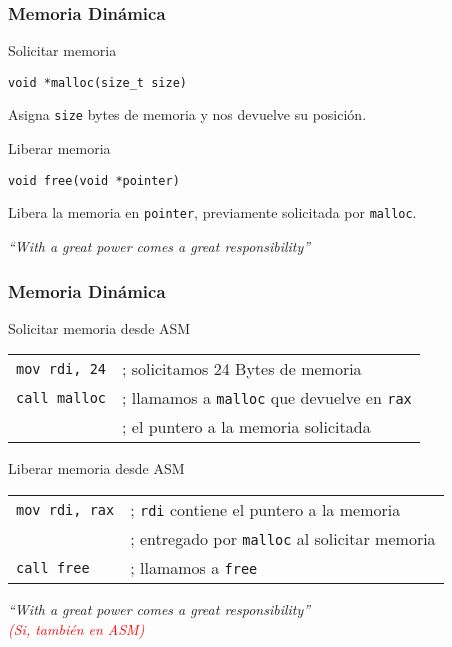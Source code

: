 \documentclass[aspectratio=169]{beamer}
\begin{document}
\begin{frame}[t]
    \frametitle{Memoria Dinámica}
    \begin{block}{Solicitar memoria}
    \begin{center}
    \textcolor{verdeuca}{\texttt{void *malloc(size\_t size)}}\\
    \end{center}
    Asigna \texttt{size} bytes de memoria y nos devuelve su posición.
    \end{block}
    \vspace{0.5cm}
    \pause
    \begin{block}{Liberar memoria}
    \begin{center}
    \textcolor{verdeuca}{\texttt{void free(void *pointer)}}\\
    \end{center}
    Libera la memoria en \texttt{pointer}, previamente solicitada por \texttt{malloc}.
    \end{block}
    \pause
    \vspace{0.3cm}
    \begin{center}
    \textit{``With a great power comes a great responsibility''} 
    \end{center}
\end{frame}

\begin{frame}[t]
    \frametitle{Memoria Dinámica}
    \begin{block}{Solicitar memoria desde ASM}
    \begin{tabular}{ll}
    \texttt{mov rdi, 24} & \textcolor{verdeuca}{; solicitamos 24 Bytes de memoria}\\
    \texttt{call malloc} & \textcolor{verdeuca}{; llamamos a \texttt{malloc} que devuelve en \texttt{rax}}\\
                         & \textcolor{verdeuca}{; el puntero a la memoria solicitada}
    \end{tabular}
    \end{block}
    \vspace{0.5cm}
    \pause
    \begin{block}{Liberar memoria desde ASM}
    \begin{tabular}{ll}
    \texttt{mov rdi, rax} & \textcolor{verdeuca}{; \texttt{rdi} contiene el puntero a la memoria}\\
                          & \textcolor{verdeuca}{; entregado por \texttt{malloc} al solicitar memoria}\\
    \texttt{call free}    & \textcolor{verdeuca}{; llamamos a \texttt{free}}
    \end{tabular}
    \end{block}
    \pause
    \vspace{0.3cm}
    \begin{center}
    \textit{``With a great power comes a great responsibility'' \\ \textcolor{red}{(Si, también en ASM)}} 
    \end{center}
\end{frame}
\end{document}
